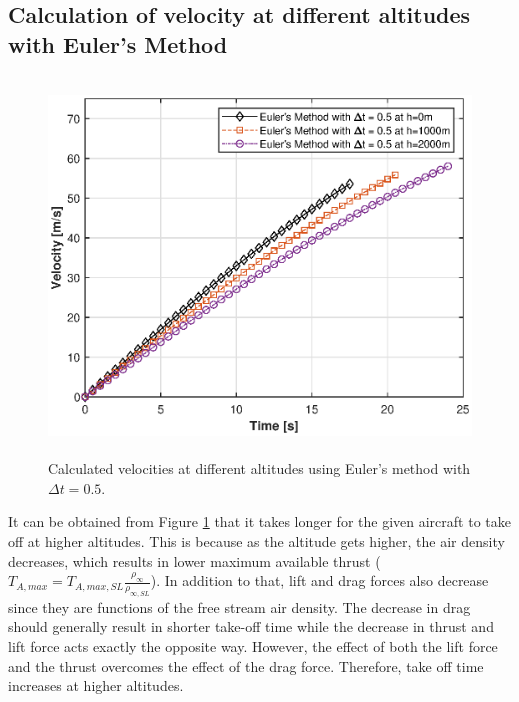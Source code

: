 \documentclass[letterpaper,12pt]{article}
\begin{document}
\subsection{Calculation of velocity at different altitudes with Euler's Method }
\begin{figure}[ht]
        \centering \includegraphics[max height=10cm]{graphs/altitude.eps}
        \caption{Calculated velocities at different altitudes using Euler's method with $\Delta t = 0.5$.}
        \label{fig:altitude}
\end{figure}

It can be obtained from Figure \ref{fig:altitude} that it takes longer for the given aircraft to take off at higher altitudes. 
This is because as the altitude gets higher, the air density decreases, which results in lower maximum available
thrust ($ T_{A,max} = T_{A,max,SL} \frac{\rho_{\infty}}{\rho_{\infty,SL}} $). In addition to that,
lift and drag forces also decrease since they are functions of the free stream air density. The decrease in drag should 
generally result in shorter take-off time while the decrease in thrust and lift force acts exactly the opposite way. However, 
the effect of both the lift force and the thrust overcomes the effect of the drag force. Therefore, take off time increases at higher altitudes.
\newpage
\end{document}
